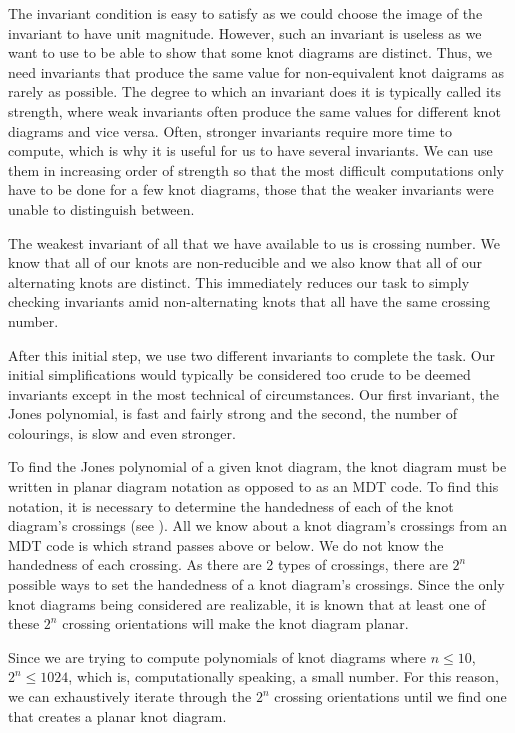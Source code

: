 \begin{paper}
The invariant condition is easy to satisfy as we could choose the image of the
invariant to have unit magnitude.
However, such an invariant is useless as we want to use to be able to show that
some knot diagrams are distinct.
Thus, we need invariants that produce the same value for non-equivalent knot
daigrams as rarely as possible.
The degree to which an invariant does it is typically called its strength, where
weak invariants often produce the same values for different knot diagrams and
vice versa.
Often, stronger invariants require more time to compute, which is why it is
useful for us to have several invariants.
We can use them in increasing order of strength so that the most difficult
computations only have to be done for a few knot diagrams, those that the weaker
invariants were unable to distinguish between.

The weakest invariant of all that we have available to us is crossing number.
We know that all of our knots are non-reducible and we also know that all of our
alternating knots are distinct.
This immediately reduces our task to simply checking invariants amid
non-alternating knots that all have the same crossing number.

After this initial step, we use two different invariants to complete the task.
Our initial simplifications would typically be considered too crude to be deemed
invariants except in the most technical of circumstances.
Our first invariant, the Jones polynomial, is fast and fairly strong and the
second, the number of colourings, is slow and even stronger.



To find the Jones polynomial of a given knot diagram, the knot diagram must be
written in planar diagram notation as opposed to as an MDT code.
To find this notation, it is necessary to determine the handedness of each of
the knot diagram's crossings (see \figCrossings).
All we know about a knot diagram's crossings from an MDT code is which strand
passes above or below.
We do not know the handedness of each crossing.
As there are 2 types of crossings, there are $2^n$ possible ways to set the
handedness of a knot diagram's crossings.
Since the only knot diagrams being considered are realizable, it is known that
at least one of these $2^n$ crossing orientations will make the knot diagram
planar.

Since we are trying to compute polynomials of knot diagrams where $n\leq10$,
$2^n\leq1024$, which is, computationally speaking, a small number.
For this reason, we can exhaustively iterate through the $2^n$ crossing
orientations until we find one that creates a planar knot diagram.


\end{paper}
